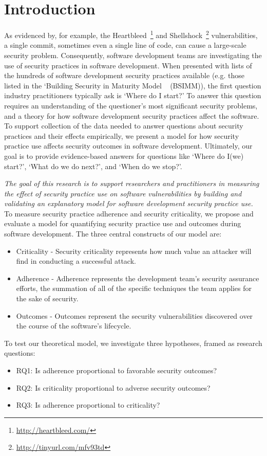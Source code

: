 \section{Introduction}
\label{sec:intro}

As evidenced by, for example, the Heartbleed~\footnote{\url{http://heartbleed.com/}} and Shellshock~\footnote{\url{http://tinyurl.com/mfv93td}} vulnerabilities, a single commit, sometimes even a single line of code, can cause a large-scale security problem.  Consequently, software development teams are investigating the use of security practices in software development. When presented with lists of the hundreds of software development security practices available (e.g. those listed in the `Building Security in Maturity Model ~\cite{mcgraw2013bsimm} (BSIMM)), the first question industry practitioners typically ask is `Where do I start?'  To answer this question requires an understanding of the questioner's most significant security problems, and a theory for how software development security practices affect the software. To support collection of the data needed to answer  questions about security practices and their effects empirically, we present a model for how security practice use affects security outcomes in software development.  Ultimately, our goal is to provide evidence-based answers for questions like `Where do I(we) start?', `What do we do next?', and `When do we stop?'.

 \textit{The goal of this research is to support researchers and practitioners in measuring the effect of security practice use on software vulnerabilities by building and validating an explanatory model for software development security practice use.}
  To measure security practice adherence and security criticality, we propose and evaluate a model for quantifying security practice use and outcomes during software development. The three central constructs of our model are:
\begin{itemize}
\item Criticality - Security criticality represents how much value an attacker will find in conducting a successful attack.
\item Adherence - Adherence represents the development team’s security assurance efforts, the summation of all of the specific techniques the team applies for the sake of security. 
\item Outcomes - Outcomes represent the security vulnerabilities discovered over the course of the software’s lifecycle.
\end{itemize}
To test our theoretical model, we investigate three hypotheses, framed as research questions:
\begin{itemize}
\item RQ1: Is adherence proportional to favorable security outcomes?
\item RQ2: Is criticality proportional to adverse security outcomes?
\item RQ3: Is adherence proportional to criticality?
\end{itemize}

